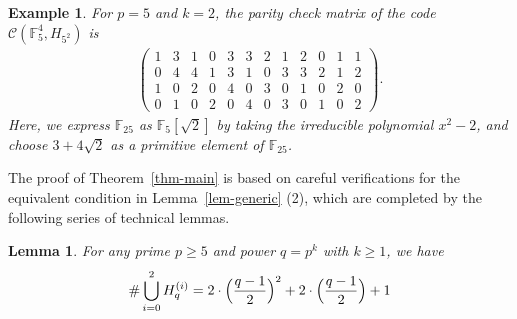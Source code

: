 \documentclass{amsart}
\newtheorem{example}[theorem]{Example}
\newtheorem{lemma}[theorem]{Lemma}
\numberwithin{equation}{section}
\newcommand{\F}{\mathbb{F}}
\begin{document}
\begin{example}
For $p=5$ and $k=2$, the parity check matrix of the code $\mathcal{C}(\F_{5}^{4}, H_{5^2})$ is
\begin{align*}
\left(\begin{array}{rrrrrrrrrrrr}
1 & 3 & 1 & 0 & 3 & 3 & 2 & 1 & 2 & 0 & 1 & 1 \\
0 & 4 & 4 & 1 & 3 & 1 & 0 & 3 & 3 & 2 & 1 & 2 \\
1 & 0 & 2 & 0 & 4 & 0 & 3 & 0 & 1 & 0 & 2 & 0 \\
0 & 1 & 0 & 2 & 0 & 4 & 0 & 3 & 0 & 1 & 0 & 2
\end{array}\right).
\end{align*}
Here, we express $\F_{25}$ as $\F_5[\sqrt{2}]$ by taking the irreducible polynomial $x^2-2$, and choose $3+4\sqrt{2}$ as a primitive element of $\F_{25}$.
\end{example}


The proof of Theorem~\ref{thm-main} is based on careful verifications for the equivalent condition in Lemma~\ref{lem-generic} (2), which are completed by the following series of technical lemmas.

\begin{lemma}
\label{lem-count}
For any prime $p \geq 5$ and power $q=p^k$ with $k\geq 1$, 
we have 
\begin{align*}
    \#\bigcup_{i=0}^{2} H_q^{(i)}=2\cdot \Bigl(\frac{q-1}{2} \Bigr)^2+2\cdot \Big(\frac{q-1}{2} \Big)+ 1
\end{align*}
    
\end{lemma}
\end{document}
